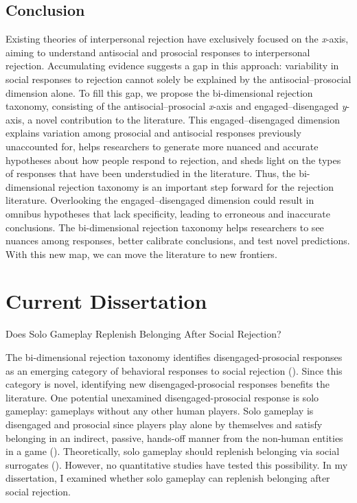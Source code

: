 \documentclass[
]{udthesis}
\begin{document}
\section{Conclusion}\label{conclusion}

Existing theories of interpersonal rejection have exclusively focused on
the \emph{x}-axis, aiming to understand antisocial and prosocial responses to
interpersonal rejection. Accumulating evidence suggests a gap in this
approach: variability in social responses to rejection cannot solely be
explained by the antisocial--prosocial dimension alone. To fill this
gap, we propose the bi-dimensional rejection taxonomy, consisting of the
antisocial--prosocial \emph{x}-axis and engaged--disengaged \emph{y}-axis, a novel
contribution to the literature. This engaged--disengaged dimension
explains variation among prosocial and antisocial responses previously
unaccounted for, helps researchers to generate more nuanced and accurate
hypotheses about how people respond to rejection, and sheds light on the
types of responses that have been understudied in the literature. Thus,
the bi-dimensional rejection taxonomy is an important step forward for
the rejection literature. Overlooking the engaged--disengaged dimension
could result in omnibus hypotheses that lack specificity, leading to
erroneous and inaccurate conclusions. The bi-dimensional rejection
taxonomy helps researchers to see nuances among responses, better
calibrate conclusions, and test novel predictions. With this new map, we
can move the literature to new frontiers.

\chapter{Current Dissertation}\label{current-dissertation}

Does Solo Gameplay Replenish Belonging After Social Rejection?

The bi-dimensional rejection taxonomy identifies disengaged-prosocial
responses as an emerging category of behavioral responses to social
rejection (). Since this category is novel, identifying new
disengaged-prosocial responses benefits the literature. One potential
unexamined disengaged-prosocial response is solo gameplay: gameplays
without any other human players. Solo gameplay is disengaged and
prosocial since players play alone by themselves and satisfy belonging
in an indirect, passive, hands-off manner from the non-human entities in
a game (). Theoretically, solo gameplay should replenish
belonging via social surrogates (). However, no quantitative
studies have tested this possibility. In my dissertation, I examined
whether solo gameplay can replenish belonging after social rejection.
\end{document}
